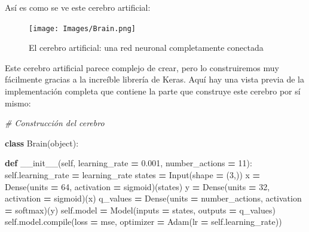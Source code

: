 \documentclass[
]{book}
\newenvironment{Shaded}{\begin{snugshade}}{\end{snugshade}}
\newcommand{\BuiltInTok}[1]{#1}
\newcommand{\CommentTok}[1]{\textcolor[rgb]{0.56,0.35,0.01}{\textit{#1}}}
\newcommand{\DecValTok}[1]{\textcolor[rgb]{0.00,0.00,0.81}{#1}}
\newcommand{\FloatTok}[1]{\textcolor[rgb]{0.00,0.00,0.81}{#1}}
\newcommand{\FunctionTok}[1]{\textcolor[rgb]{0.00,0.00,0.00}{#1}}
\newcommand{\KeywordTok}[1]{\textcolor[rgb]{0.13,0.29,0.53}{\textbf{#1}}}
\newcommand{\NormalTok}[1]{#1}
\newcommand{\OperatorTok}[1]{\textcolor[rgb]{0.81,0.36,0.00}{\textbf{#1}}}
\newcommand{\StringTok}[1]{\textcolor[rgb]{0.31,0.60,0.02}{#1}}
\newcommand{\VariableTok}[1]{\textcolor[rgb]{0.00,0.00,0.00}{#1}}
\begin{document}
Así es como se ve este cerebro artificial:

\begin{figure}
\centering
\texttt{[image: Images/Brain.png]}
\caption{El cerebro artificial: una red neuronal completamente conectada}
\end{figure}

Este cerebro artificial parece complejo de crear, pero lo construiremos muy fácilmente gracias a la increíble librería de Keras. Aquí hay una vista previa de la implementación completa que contiene la parte que construye este cerebro por sí mismo:\\

\begin{Shaded}
\begin{Highlighting}[]
\CommentTok{\# Construcción del cerebro}

\KeywordTok{class}\NormalTok{ Brain(}\BuiltInTok{object}\NormalTok{):}

    \KeywordTok{def} \FunctionTok{\_\_init\_\_}\NormalTok{(}\VariableTok{self}\NormalTok{, learning\_rate }\OperatorTok{=} \FloatTok{0.001}\NormalTok{, number\_actions }\OperatorTok{=} \DecValTok{11}\NormalTok{):}
        \VariableTok{self}\NormalTok{.learning\_rate }\OperatorTok{=}\NormalTok{ learning\_rate}
\NormalTok{        states }\OperatorTok{=}\NormalTok{ Input(shape }\OperatorTok{=}\NormalTok{ (}\DecValTok{3}\NormalTok{,))}
\NormalTok{        x }\OperatorTok{=}\NormalTok{ Dense(units }\OperatorTok{=} \DecValTok{64}\NormalTok{, activation }\OperatorTok{=} \StringTok{\textquotesingle{}sigmoid\textquotesingle{}}\NormalTok{)(states)}
\NormalTok{        y }\OperatorTok{=}\NormalTok{ Dense(units }\OperatorTok{=} \DecValTok{32}\NormalTok{, activation }\OperatorTok{=} \StringTok{\textquotesingle{}sigmoid\textquotesingle{}}\NormalTok{)(x)}
\NormalTok{        q\_values }\OperatorTok{=}\NormalTok{ Dense(units }\OperatorTok{=}\NormalTok{ number\_actions, activation }\OperatorTok{=} \StringTok{\textquotesingle{}softmax\textquotesingle{}}\NormalTok{)(y)}
        \VariableTok{self}\NormalTok{.model }\OperatorTok{=}\NormalTok{ Model(inputs }\OperatorTok{=}\NormalTok{ states, outputs }\OperatorTok{=}\NormalTok{ q\_values)}
        \VariableTok{self}\NormalTok{.model.}\BuiltInTok{compile}\NormalTok{(loss }\OperatorTok{=} \StringTok{\textquotesingle{}mse\textquotesingle{}}\NormalTok{, optimizer }\OperatorTok{=}\NormalTok{ Adam(lr }\OperatorTok{=} \VariableTok{self}\NormalTok{.learning\_rate))}
\end{Highlighting}
\end{Shaded}
\end{document}
